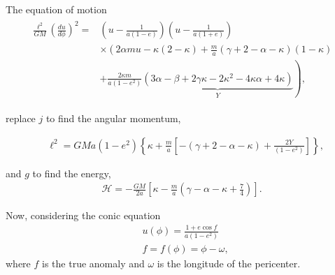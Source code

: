 The equation of motion
\begin{align}
\begin{split}
\label{eq: equationmotionsecond}
	\frac{\ell^2}{GM}\left(\frac{du}{d\phi}\right)^2 = &\left(u-\frac{1}{a(1-e)}\right)\left(u-\frac{1}{a(1+e)}\right)\\
	&\times \left(2\alpha m u-\kappa(2-\kappa)+\frac{m}{a}(\gamma+2-\alpha-\kappa)(1-\kappa)\right.\\
	&\left.+\frac{2\kappa m }{a(1-e^2)}\underbrace{(3\alpha-\beta + 2\gamma\kappa -2\kappa^2 - 4\kappa\alpha + 4\kappa )}_Y\right),
	\end{split}
	\end{align}

replace $j$ to find the angular momentum, 

\begin{align}\label{eq: angularmomentumj+1}
	&\ell^2 = GMa(1-e^2)\left\{\kappa+\frac{m}{a}\left[-(\gamma+2-\alpha-\kappa)+\frac{2Y}{(1-e^2)}\right]\right\},
\end{align}
	
and $g$ to find the energy,
\begin{align} \label{eq: energyg+1}
	\mathcal{H} = - \frac{GM}{2a}\left[\kappa-\frac{m}{a}\left(\gamma-\alpha-\kappa+\frac{7}{4}\right)\right].	
\end{align}
	
Now, considering the conic equation
\begin{align}
	&u(\phi) = \frac{1+e\cos f}{a(1-e^2)}\\
	&f=f(\phi) = \phi - \omega,
\end{align}
where $f$ is the true anomaly and $\omega$ is the longitude of the pericenter.\\



